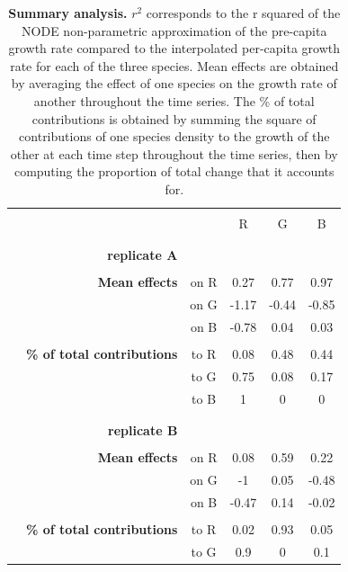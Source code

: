 \documentclass[11pt, oneside]{article}
\begin{document}
\newpage
\begin{table}[H]
\begin{center}
\caption{
\textbf{Summary analysis.}
$r^2$ corresponds to the r squared of the NODE non-parametric approximation of the pre-capita growth rate compared to the interpolated per-capita growth rate for each of the three species.
Mean effects are obtained by averaging the effect of one species on the growth rate of another throughout the time series.
The \% of total contributions is obtained by summing the square of contributions of one species density to the growth of the other at each time step throughout the time series, then by computing the proportion of total change that it accounts for.
}
\begin{tabular}{rrcccc}
	\hline
	\\
	& & & R & G & B \\
	& \\
	\hline
	& \\
	& \textbf{replicate A} \\
	& \\
	& \textbf{Mean effects} 
	&   on R &   0.27 & 0.77  & 0.97  \\
	& & on G &  -1.17 & -0.44 & -0.85 \\
	& & on B &  -0.78 & 0.04  & 0.03  \\
	& \\
	& \textbf{\% of total contributions} 
	&   to R &  0.08 & 0.48 & 0.44 \\ 
    & & to G &  0.75 & 0.08 & 0.17 \\
    & & to B &  1    & 0    & 0    \\
	& \\
	\hline
	& \\
	& \textbf{replicate B} \\
	& \\
	& \textbf{Mean effects} 
	& on R   &   0.08 & 0.59 & 0.22  \\
	& & on G &  -1    & 0.05 & -0.48 \\
	& & on B &  -0.47 & 0.14 & -0.02 \\
	& \\
	& \textbf{\% of total contributions} 
	& to R   &  0.02 & 0.93 & 0.05 \\ 
    & & to G &  0.9  & 0    & 0.1  \\

\end{tabular}
\end{center}
\end{table}
\end{document}

